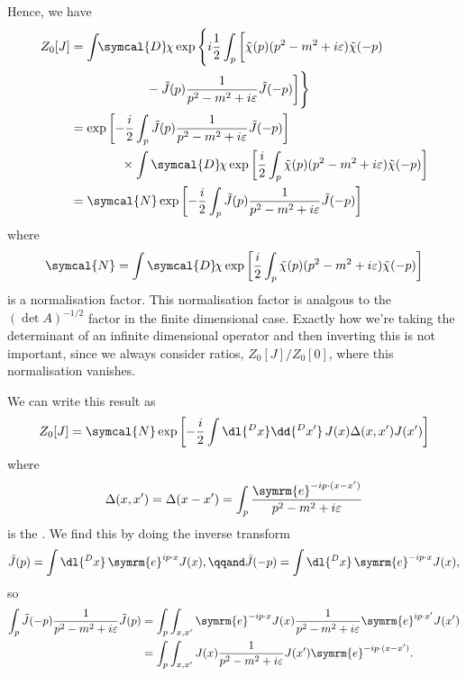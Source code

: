 \documentclass[fleqn]{NotesClass}
\newcommand{\e}{\symrm{e}}
\newcommand{\DL}[1]{\symcal{D}#1}
\begin{document}
    Hence, we have
    \begingroup
    \allowdisplaybreaks
    \begin{align}
        Z_0[J] &= \int \!\! \DL{\mkern-2mu\chi} \exp\Bigg\{ i\frac{1}{2}\int_p \bigg[ \tilde{\chi}(p)(p^2 - m^2 + i\varepsilon)\tilde{\chi}(-p)\\
        &\qquad\qquad\qquad- \tilde{J}(p) \frac{1}{p^2 - m^2 + i\varepsilon}\tilde{J}(-p) \bigg]  \Bigg\}\\
        &= \exp\left[ -\frac{i}{2} \int_p \tilde{J}(p) \frac{1}{p^2 - m^2 + i\varepsilon} \tilde{J}(-p) \right]\\
        &\qquad\qquad\times\int \DL{\mkern-2mu\chi} \exp\left[ \frac{i}{2} \int_p \tilde{\chi}(p)(p^2 - m^2 + i\varepsilon)\tilde{\chi}(-p) \right]\\
        &= \symcal{N} \exp\left[ -\frac{i}{2} \int_p \tilde{J}(p) \frac{1}{p^2 - m^2 + i\varepsilon} \tilde{J}(-p) \right]
    \end{align}
    \endgroup
    where
    \begin{equation}
        \symcal{N} = \int \DL{\mkern-2mu\chi} \exp\left[ \frac{i}{2} \int_p \tilde{\chi}(p)(p^2 - m^2 + i\varepsilon)\tilde{\chi}(-p) \right]
    \end{equation}
    is a normalisation factor.
    This normalisation factor is analgous to the \((\det A)^{-1/2}\) factor in the finite dimensional case.
    Exactly how we're taking the determinant of an infinite dimensional operator and then inverting this is not important, since we always consider ratios, \(Z_0[J]/Z_0[0]\), where this normalisation vanishes.
    
    We can write this result as
    \begin{equation}\label{eqn:Z0[J]}
        Z_0[J] = \symcal{N}\exp\left[ -\frac{i}{2} \int \dl{^Dx} \dd{^Dx'} \, J(x) \Delta(x, x') J(x') \right]
    \end{equation}
    where
    \begin{equation}
        \Delta(x, x') = \Delta(x - x') = \int_p \frac{\e^{-ip\cdot (x - x')}}{p^2 - m^2 + i\varepsilon}
    \end{equation}
    is the .
    We find this by doing the inverse transform
    \begin{equation}
        \tilde{J}(p) = \int \dl{^Dx} \, \e^{ip\cdot x} J(x), \qqand \tilde{J}(-p) = \int \dl{^Dx} \, \e^{-ip\cdot x} J(x),
    \end{equation}
    so
    \begin{align*}
        \int_p \tilde{J}(-p) \frac{1}{p^2 - m^2 + i\varepsilon} \tilde{J}(p) &= \int_p \int_{x,x'} \e^{-ip\cdot x} J(x) \frac{1}{p^2 - m^2 + i\varepsilon} \e^{ip \cdot x'} J(x')\\
        &= \int_p \int_{x,x'} J(x)\frac{1}{p^2 - m^2 + i\varepsilon} J(x') \e^{-ip \cdot (x - x')}.
    \end{align*}
    
\end{document}
